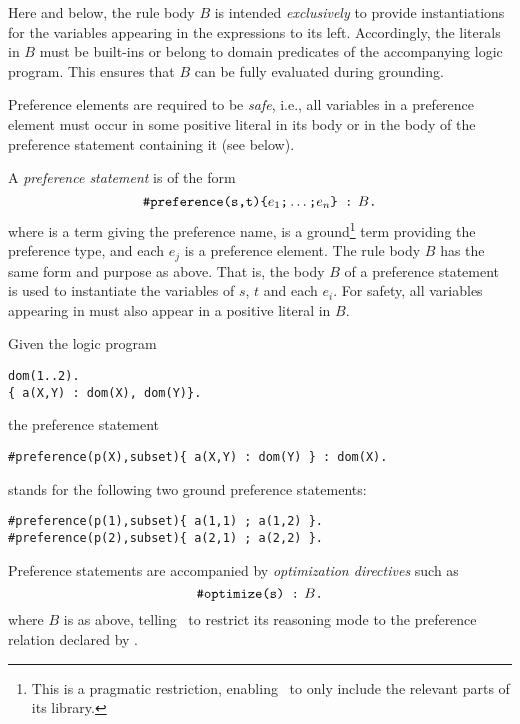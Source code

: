 \begin{note}
Here and below, 
the rule body $B$ is intended \emph{exclusively} to provide instantiations for the variables appearing in the expressions to its left.  
Accordingly, the literals in $B$ must be built-ins or belong to domain predicates of the accompanying logic program.
This ensures that $B$ can be fully evaluated during grounding.
\end{note}


\begin{note}
Preference elements are required to be \emph{safe}, 
i.e., all variables in a preference element must occur in some positive literal 
in its body or in the body of the preference statement containing it (see below).  
\end{note} 

A \emph{preference statement} is of the form %
\[\texttt{\#preference(s,t)\{}e_1\texttt{;}\dots\texttt{;}e_n\texttt{\} : }\!\!\!\!B\texttt{.}\]
%
where  is a term giving the preference name, 
 is a ground\footnote{This is a pragmatic restriction,
enabling \asprin\ to only include the relevant parts of its library.} 
term providing the preference type, 
and each $e_j$ is a preference element.
The rule body $B$ has the same form and purpose as above.
%
That is, the body $B$ of a preference statement is used to instantiate the variables of $s$, $t$ and each $e_i$.
For safety, all variables appearing in  must also appear in a positive literal in $B$.

\begin{example}
\label{asprin:example2}
Given the logic program 
\begin{lstlisting}[numbers=none]
dom(1..2).
{ a(X,Y) : dom(X), dom(Y)}.
\end{lstlisting}
the preference statement 
\begin{lstlisting}[numbers=none]
#preference(p(X),subset){ a(X,Y) : dom(Y) } : dom(X).
\end{lstlisting}
stands for the following two ground preference statements:
\begin{lstlisting}[numbers=none]
#preference(p(1),subset){ a(1,1) ; a(1,2) }.
#preference(p(2),subset){ a(2,1) ; a(2,2) }.
\end{lstlisting}
\end{example}

Preference statements are accompanied by 
\emph{optimization directives} such as
\[\texttt{\#optimize(s) : }\!\!\!\!B\texttt{.}\]
where $B$ is as above, 
telling \asprin\ to restrict its reasoning mode to the preference relation declared by .
% 

